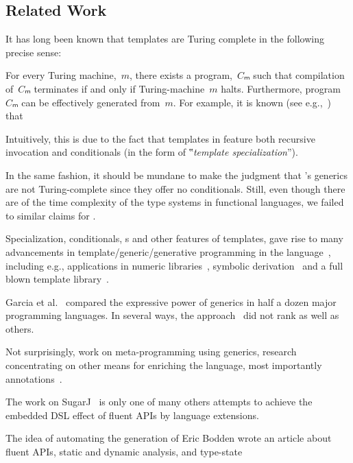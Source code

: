 \subsection{Related Work}

It has long been known
  that \CC templates are Turing complete in the following precise sense:

\begin{Proposition}
  \label{Theorem:Gutterman}
  For every Turing machine,~$m$, there exists a \CC program,~$Cₘ$ such that
    compilation of~$Cₘ$ terminates if and only if
      Turing-machine~$m$ halts.
  Furthermore, program~$Cₘ$ can be effectively generated from~$m$.
For example, it is known (see e.g.,~\cite{Gutterman:2003}) that
\end{Proposition}

Intuitively, this is due to the fact that templates in \CC
  feature both recursive invocation and conditionals (in the form of
  ‟\emph{template specialization}”).  

In the same fashion, it should be mundane to make the judgment that
  \Java's generics are not Turing-complete since they offer no conditionals. 
Still, even though there are of the time complexity of the type systems in functional
  languages, we failed to similar claims for \Java.

Specialization, conditionals, s and other features of \CC templates,
  gave rise to many advancements in template/generic/generative programming 
  in the language~\cite{Austern:1998,Musser:Stepanov:1989,Backhouse:Jansson:1999,Dehnert:Stepanov:2000},
  including e.g., applications in numeric libraries~\cite{Veldhuizen:95},
  symbolic derivation~\cite{Gil:Gutterman:98}
  and a full blown template library~\cite{Abrahams:Gurtovoy:04}.

Garcia et al.~\cite{X:Garcia:Jarvi:Lumsdaine:Siek:Willcock:03} compared 
  the expressive power of generics in half a dozen major programming languages. 
  In several ways, the \Java approach~\cite{Bracha:Odersky:Stoutamire:Wadler:98r}
  did not rank as well as others.

Not surprisingly, work on meta-programming using \Java generics, 
  research concentrating on other means for enriching the language,
  most importantly annotations~\cite{Papi:08}.

The work on SugarJ~\cite{Sugar:J} is only one of many others attempts 
  to achieve the embedded DSL effect of fluent APIs by language extensions.

The idea of automating the generation of Eric Bodden wrote an article about fluent APIs, static and dynamic analysis, and type-state~\cite{Bodden:14}


